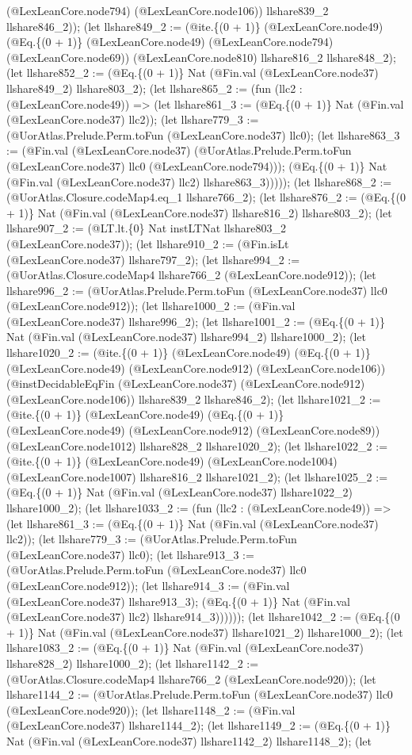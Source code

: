 \documentclass[11pt]{article}
\begin{document}
(@LexLeanCore.node794) (@LexLeanCore.node106)) llshare839\_2 llshare846\_2)); (let llshare849\_2 := (@ite.\{(0 + 1)\} (@LexLeanCore.node49) (@Eq.\{(0 + 1)\} (@LexLeanCore.node49) (@LexLeanCore.node794) (@LexLeanCore.node69)) (@LexLeanCore.node810) llshare816\_2 llshare848\_2); (let llshare852\_2 := (@Eq.\{(0 + 1)\} Nat (@Fin.val (@LexLeanCore.node37) llshare849\_2) llshare803\_2); (let llshare865\_2 := (fun (llc2 : (@LexLeanCore.node49)) => (let llshare861\_3 := (@Eq.\{(0 + 1)\} Nat (@Fin.val (@LexLeanCore.node37) llc2)); (let llshare779\_3 := (@UorAtlas.Prelude.Perm.toFun (@LexLeanCore.node37) llc0); (let llshare863\_3 := (@Fin.val (@LexLeanCore.node37) (@UorAtlas.Prelude.Perm.toFun (@LexLeanCore.node37) llc0 (@LexLeanCore.node794))); (@Eq.\{(0 + 1)\} Nat (@Fin.val (@LexLeanCore.node37) llc2) llshare863\_3))))); (let llshare868\_2 := (@UorAtlas.Closure.codeMap4.eq\_1 llshare766\_2); (let llshare876\_2 := (@Eq.\{(0 + 1)\} Nat (@Fin.val (@LexLeanCore.node37) llshare816\_2) llshare803\_2); (let llshare907\_2 := (@LT.lt.\{0\} Nat instLTNat llshare803\_2 (@LexLeanCore.node37)); (let llshare910\_2 := (@Fin.isLt (@LexLeanCore.node37) llshare797\_2); (let llshare994\_2 := (@UorAtlas.Closure.codeMap4 llshare766\_2 (@LexLeanCore.node912)); (let llshare996\_2 := (@UorAtlas.Prelude.Perm.toFun (@LexLeanCore.node37) llc0 (@LexLeanCore.node912)); (let llshare1000\_2 := (@Fin.val (@LexLeanCore.node37) llshare996\_2); (let llshare1001\_2 := (@Eq.\{(0 + 1)\} Nat (@Fin.val (@LexLeanCore.node37) llshare994\_2) llshare1000\_2); (let llshare1020\_2 := (@ite.\{(0 + 1)\} (@LexLeanCore.node49) (@Eq.\{(0 + 1)\} (@LexLeanCore.node49) (@LexLeanCore.node912) (@LexLeanCore.node106)) (@instDecidableEqFin (@LexLeanCore.node37) (@LexLeanCore.node912) (@LexLeanCore.node106)) llshare839\_2 llshare846\_2); (let llshare1021\_2 := (@ite.\{(0 + 1)\} (@LexLeanCore.node49) (@Eq.\{(0 + 1)\} (@LexLeanCore.node49) (@LexLeanCore.node912) (@LexLeanCore.node89)) (@LexLeanCore.node1012) llshare828\_2 llshare1020\_2); (let llshare1022\_2 := (@ite.\{(0 + 1)\} (@LexLeanCore.node49) (@LexLeanCore.node1004) (@LexLeanCore.node1007) llshare816\_2 llshare1021\_2); (let llshare1025\_2 := (@Eq.\{(0 + 1)\} Nat (@Fin.val (@LexLeanCore.node37) llshare1022\_2) llshare1000\_2); (let llshare1033\_2 := (fun (llc2 : (@LexLeanCore.node49)) => (let llshare861\_3 := (@Eq.\{(0 + 1)\} Nat (@Fin.val (@LexLeanCore.node37) llc2)); (let llshare779\_3 := (@UorAtlas.Prelude.Perm.toFun (@LexLeanCore.node37) llc0); (let llshare913\_3 := (@UorAtlas.Prelude.Perm.toFun (@LexLeanCore.node37) llc0 (@LexLeanCore.node912)); (let llshare914\_3 := (@Fin.val (@LexLeanCore.node37) llshare913\_3); (@Eq.\{(0 + 1)\} Nat (@Fin.val (@LexLeanCore.node37) llc2) llshare914\_3)))))); (let llshare1042\_2 := (@Eq.\{(0 + 1)\} Nat (@Fin.val (@LexLeanCore.node37) llshare1021\_2) llshare1000\_2); (let llshare1083\_2 := (@Eq.\{(0 + 1)\} Nat (@Fin.val (@LexLeanCore.node37) llshare828\_2) llshare1000\_2); (let llshare1142\_2 := (@UorAtlas.Closure.codeMap4 llshare766\_2 (@LexLeanCore.node920)); (let llshare1144\_2 := (@UorAtlas.Prelude.Perm.toFun (@LexLeanCore.node37) llc0 (@LexLeanCore.node920)); (let llshare1148\_2 := (@Fin.val (@LexLeanCore.node37) llshare1144\_2); (let llshare1149\_2 := (@Eq.\{(0 + 1)\} Nat (@Fin.val (@LexLeanCore.node37) llshare1142\_2) llshare1148\_2); (let 
\end{document}
